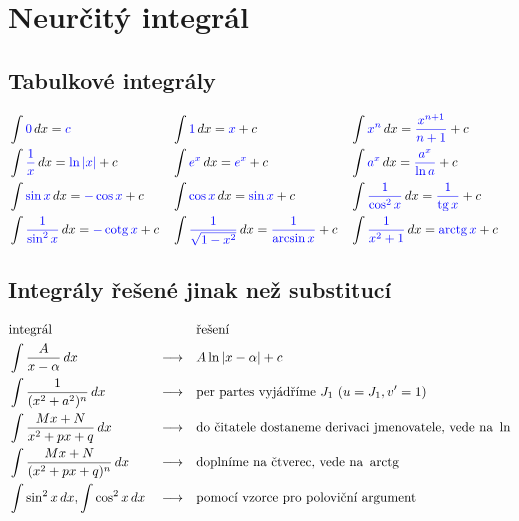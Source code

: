 \section{Neurčitý integrál}\label{appint}
\subsection*{Tabulkové integrály}
\begin{align*}
&\int \textcolor{blue}{0} \, dx = \textcolor{blue}{c} & & \int \textcolor{blue}{1}\,  dx = \textcolor{blue}{x}+c & & \int \textcolor{blue}{x^n} \, dx = \textcolor{blue}{\frac{x^{n+1}}{n+1}}+c \\
&\int \textcolor{blue}{\frac{1}{x}} \, dx = \textcolor{blue}{\operatorname{ln} |x|} + c & & \int \textcolor{blue}{e^x}\, dx = \textcolor{blue}{e^x}+c & &  \int \textcolor{blue}{a^x} \, dx = \textcolor{blue}{\frac{a^x}{\operatorname{ln} a}} + c \\
&\int \textcolor{blue}{\sin x} \, dx = \textcolor{blue}{-\cos x} + c & & \int \textcolor{blue}{\cos x} \, dx = \textcolor{blue}{\sin x} +c & &\int \textcolor{blue}{\frac{1}{\cos^2 x}}\, dx = \textcolor{blue}{\frac{1}{\operatorname{tg} x}} + c \\
&\int \textcolor{blue}{\frac{1}{\sin^2 x}} \, dx = \textcolor{blue}{-\operatorname{cotg} x}+c & & \int \textcolor{blue}{\frac{1}{\sqrt{1-x^2} }}\, dx = \textcolor{blue}{\frac{1}{\arcsin x}} + c & &\int \textcolor{blue}{\frac{1}{x^2+1}}\, dx = \textcolor{blue}{\operatorname{arctg} x} + c&
\end{align*}

\subsection*{Integrály řešené jinak než substitucí}
\begin{align*}
    &\textrm{integrál}                        & &                 & & \textrm{řešení} \\
    &\int \frac{A}{x-\alpha}\, dx             & & \longrightarrow & & A\operatorname{ln}|x-\alpha|+c \\
    &\int \frac{1}{(x^2+a^2)^n}\, dx          & & \longrightarrow & & \textrm{per partes vyjádříme } J_1 \textrm{ ($u=J_1, v^\prime=1$)}\\
    &\int \frac{Mx+N}{x^2+px+q}\, dx          & & \longrightarrow & & \textrm{do čitatele dostaneme derivaci jmenovatele, vede na }\operatorname{ln} \\
    &\int \frac{Mx+N}{(x^2+px+q)^n}\, dx      & & \longrightarrow & & \textrm{doplníme na čtverec, vede na }\operatorname{arctg}  \\
    &\int \sin^2 x\, dx, \int \cos^2 x \, dx  & & \longrightarrow & & \textrm{pomocí vzorce pro poloviční argument}
\end{align*}

